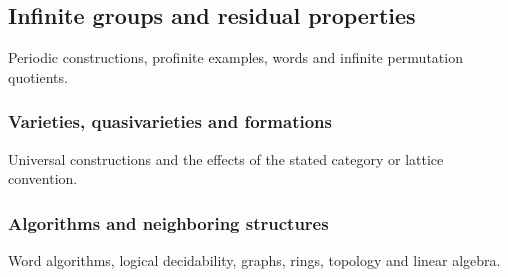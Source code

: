 \subsection{Infinite groups and residual properties}
\label{portfolio:infinite}
Periodic constructions, profinite examples, words and infinite permutation quotients.
\begingroup
\let\subsection\subsubsection









\endgroup

\subsection{Varieties, quasivarieties and formations}
\label{portfolio:varieties}
Universal constructions and the effects of the stated category or lattice convention.
\begingroup
\let\subsection\subsubsection








\endgroup

\subsection{Algorithms and neighboring structures}
\label{portfolio:other}
Word algorithms, logical decidability, graphs, rings, topology and linear algebra.
\begingroup
\let\subsection\subsubsection












\endgroup
